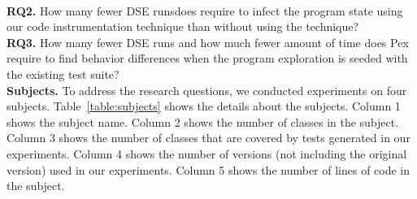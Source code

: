 		\\ \textbf{RQ2.} How many fewer DSE runsdoes  require to infect the program state using our code instrumentation technique than without using the technique?
	\\ \textbf{RQ3.} How many fewer DSE runs and how much fewer amount of time does Pex require to find behavior differences when the program exploration is seeded with the existing test suite?
%	
%
%	
%												
%
\\  \textbf{Subjects.} To address the research questions, we conducted experiments on four subjects.
Table~\ref{table:subjects} shows the details about the subjects. Column 1 shows the subject name. Column 2 shows the number of classes in the subject. Column 3 shows the number of classes that are covered by tests generated in our experiments. Column 4 shows the number of versions (not including the original version) used in our experiments. Column 5 shows the number of lines of code in the subject.

